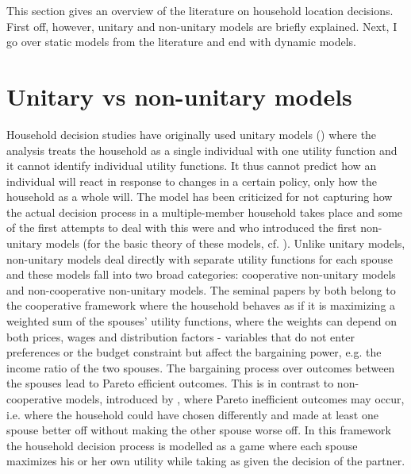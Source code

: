 
This section gives an overview of the literature on household location decisions. First off, however, unitary and non-unitary models are briefly explained. Next, I go over static models from the literature and end with dynamic models.

\section{Unitary vs non-unitary models}\label{sec:uni_nonuni}
Household decision studies have originally used unitary models (\cite{Samuelson1956,Becker1962,Becker1981}) where the analysis treats the household as a single individual with one utility function and it cannot identify individual utility functions. It thus cannot predict how an individual will react in response to changes in a certain policy, only how the household as a whole will. The model has been criticized for not capturing how the actual decision process in a multiple-member household takes place and some of the first attempts to deal with this were \cite{ManserBrown1980} and \cite{McElroyetal1981} who introduced the first non-unitary models (for the basic theory of these models, cf. \cite{Chiappori1988,Chiappori1992,BrowningChiappori1998}). Unlike unitary models, non-unitary models deal directly with separate utility functions for each spouse and these models fall into two broad categories: cooperative non-unitary models and non-cooperative non-unitary models. The seminal papers by \cite{ManserBrown1980,McElroyetal1981} both belong to the cooperative framework where the household behaves as if it is maximizing a weighted sum of the spouses' utility functions, where the weights can depend on both prices, wages and distribution factors - variables that do not enter preferences or the budget constraint but affect the bargaining power, e.g. the income ratio of the two spouses.  The bargaining process over outcomes between the spouses lead to Pareto efficient outcomes. This is in contrast to non-cooperative models, introduced by \cite{LundbergPollak1993}, where Pareto inefficient outcomes may occur, i.e. where the household could have chosen differently and made at least one spouse better off without making the other spouse worse off. In this framework the household decision process is modelled as a game where each spouse maximizes his or her own utility while taking as given the decision of the partner. 

